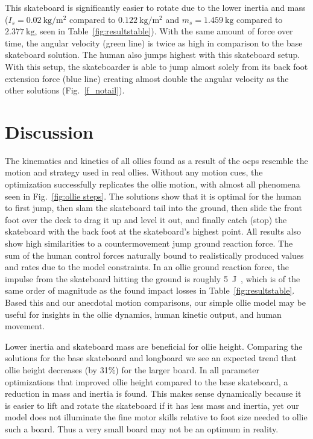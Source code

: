 \documentclass[default,iicol]{sn-jnl}
\begin{document}
This skateboard is significantly easier to rotate due to the lower inertia and mass ($I_s = \SI{0.02}{\kilo\gram\per\meter\squared}$ compared to $\SI{0.122}{\kilo\gram\per\meter\squared}$ and $m_s = \SI{1.459}{\kilo\gram}$ compared to $\SI{2.377}{\kilo\gram}$, seen in Table~\ref{fig:resultstable}).
With the same amount of force over time, the angular velocity (green line) is twice as high in comparison to the base skateboard solution.
The human also jumps highest with this skateboard setup.
With this setup, the skateboarder is able to jump almost solely from its back foot extension force (blue line) creating almost double the angular velocity as the other solutions (Fig.~\ref{f_notail}).

\section{Discussion}
The kinematics and kinetics of all ollies found as a result of the \glspl{ocp} resemble the motion and strategy used in real ollies.
Without any motion cues, the optimization successfully replicates the ollie motion, with almost all phenomena seen in Fig.~\ref{fig:ollie steps}.
The solutions show that it is optimal for the human to first jump, then slam the skateboard tail into the ground, then slide the front foot over the deck to drag it up and level it out, and finally catch (stop) the skateboard with the back foot at the skateboard's highest point.
All results also show high similarities to a countermovement jump ground reaction force.
The sum of the human control forces naturally bound to realistically produced values and rates due to the model constraints.
In an ollie ground reaction force, the impulse from the skateboard hitting the ground is roughly \SI{5}{\joule}~\cite{determan_kinetics_2006}, which is of the same order of magnitude as the found impact losses in Table~\ref{fig:resultstable}.
Based this and our anecdotal motion comparisons, our simple ollie model may be useful for insights in the ollie dynamics, human kinetic output, and human movement.

Lower inertia and skateboard mass are beneficial for ollie height.
Comparing the solutions for the base skateboard and longboard we see an expected trend that ollie height decreases (by 31\%) for the larger board.
In all parameter optimizations that improved ollie height compared to the base skateboard, a reduction in mass and inertia is found.
This makes sense dynamically because it is easier to lift and rotate the skateboard if it has less mass and inertia, yet our model does not illuminate the fine motor skills relative to foot size needed to ollie such a board. Thus a very small board may not be an optimum in reality.
\end{document}

